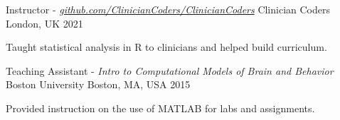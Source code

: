 %
%
%


\vspace*{0.4cm}

\begin{cventries}

    \cventry
        {Instructor - \textit{\href{https://github.com/ClinicianCoders/ClinicianCoders}{github.com/ClinicianCoders/ClinicianCoders}}}
        {Clinician Coders}
        {London, UK}
        {2021}
        {
            \begin{cvitems}
                \item Taught statistical analysis in R to clinicians and helped build curriculum.
            \end{cvitems}\vspace{1.5\baselineskip}
        }

    \vspace*{0.2cm}

    \cventry
        {Teaching Assistant - \textit{Intro to Computational Models of Brain and Behavior}}
        {Boston University}
        {Boston, MA, USA}
        {2015}
        {
            \begin{cvitems}
                \item Provided instruction on the use of MATLAB for labs and assignments.
            \end{cvitems}\vspace{1.5\baselineskip}
        }

\end{cventries}

\vspace*{-0.35cm}
